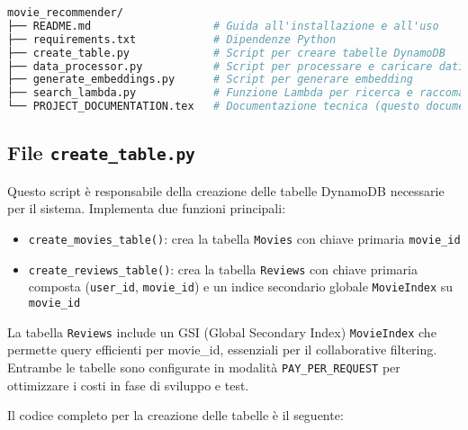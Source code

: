 \documentclass[11pt,a4paper]{article}
\begin{document}
\begin{lstlisting}[language=bash]
movie_recommender/
├── README.md                   # Guida all'installazione e all'uso
├── requirements.txt            # Dipendenze Python
├── create_table.py             # Script per creare tabelle DynamoDB
├── data_processor.py           # Script per processare e caricare dati
├── generate_embeddings.py      # Script per generare embedding
├── search_lambda.py            # Funzione Lambda per ricerca e raccomandazione
└── PROJECT_DOCUMENTATION.tex   # Documentazione tecnica (questo documento)
\end{lstlisting}

\subsection{File \texttt{create\_table.py}}
Questo script è responsabile della creazione delle tabelle DynamoDB necessarie per il sistema. Implementa due funzioni principali:

\begin{itemize}
  \item \texttt{create\_movies\_table()}: crea la tabella \texttt{Movies} con chiave primaria \texttt{movie\_id}
  \item \texttt{create\_reviews\_table()}: crea la tabella \texttt{Reviews} con chiave primaria composta (\texttt{user\_id}, \texttt{movie\_id}) e un indice secondario globale \texttt{MovieIndex} su \texttt{movie\_id}
\end{itemize}

La tabella \texttt{Reviews} include un GSI (Global Secondary Index) \texttt{MovieIndex} che permette query efficienti per movie\_id, essenziali per il collaborative filtering. Entrambe le tabelle sono configurate in modalità \texttt{PAY\_PER\_REQUEST} per ottimizzare i costi in fase di sviluppo e test.

Il codice completo per la creazione delle tabelle è il seguente:
\end{document}
